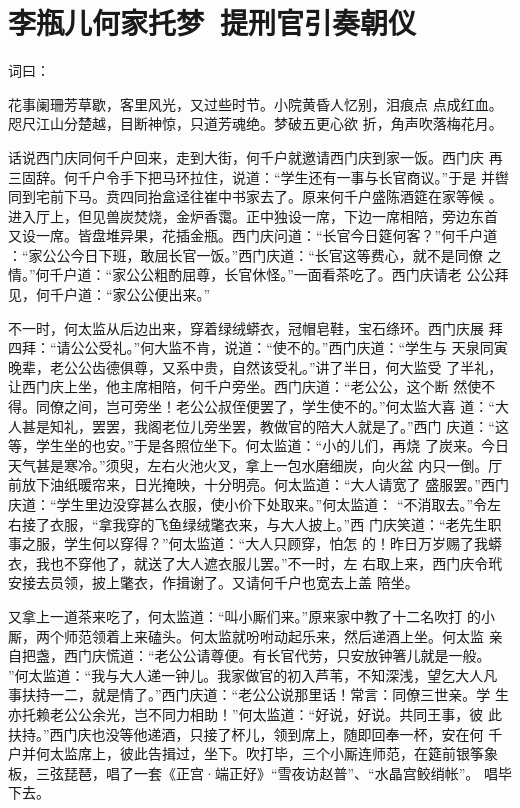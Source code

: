 \chapter{李瓶儿何家托梦~提刑官引奏朝仪}

词曰：

花事阑珊芳草歇，客里风光，又过些时节。小院黄昏人忆别，泪痕点
点成红血。  咫尺江山分楚越，目断神惊，只道芳魂绝。梦破五更心欲
折，角声吹落梅花月。

话说西门庆同何千户回来，走到大街，何千户就邀请西门庆到家一饭。西门庆
再三固辞。何千户令手下把马环拉住，说道：“学生还有一事与长官商议。”于是
并辔同到宅前下马。贲四同抬盒迳往崔中书家去了。原来何千户盛陈酒筵在家等候
。进入厅上，但见兽炭焚烧，金炉香霭。正中独设一席，下边一席相陪，旁边东首
又设一席。皆盘堆异果，花插金瓶。西门庆问道：“长官今日筵何客？”何千户道
：“家公公今日下班，敢屈长官一饭。”西门庆道：“长官这等费心，就不是同僚
之情。”何千户道：“家公公粗酌屈尊，长官休怪。”一面看茶吃了。西门庆请老
公公拜见，何千户道：“家公公便出来。”

不一时，何太监从后边出来，穿着绿绒蟒衣，冠帽皂鞋，宝石绦环。西门庆展
拜四拜：“请公公受礼。”何大监不肯，说道：“使不的。”西门庆道：“学生与
天泉同寅晚辈，老公公齿德俱尊，又系中贵，自然该受礼。”讲了半日，何大监受
了半礼，让西门庆上坐，他主席相陪，何千户旁坐。西门庆道：“老公公，这个断
然使不得。同僚之间，岂可旁坐！老公公叔侄便罢了，学生使不的。”何太监大喜
道：“大人甚是知礼，罢罢，我阁老位儿旁坐罢，教做官的陪大人就是了。”西门
庆道：“这等，学生坐的也安。”于是各照位坐下。何太监道：“小的儿们，再烧
了炭来。今日天气甚是寒冷。”须臾，左右火池火叉，拿上一包水磨细炭，向火盆
内只一倒。厅前放下油纸暖帘来，日光掩映，十分明亮。何太监道：“大人请宽了
盛服罢。”西门庆道：“学生里边没穿甚么衣服，使小价下处取来。”何太监道：
“不消取去。”令左右接了衣服，“拿我穿的飞鱼绿绒氅衣来，与大人披上。”西
门庆笑道：“老先生职事之服，学生何以穿得？”何太监道：“大人只顾穿，怕怎
的！昨日万岁赐了我蟒衣，我也不穿他了，就送了大人遮衣服儿罢。”不一时，左
右取上来，西门庆令玳安接去员领，披上氅衣，作揖谢了。又请何千户也宽去上盖
陪坐。

又拿上一道茶来吃了，何太监道：“叫小厮们来。”原来家中教了十二名吹打
的小厮，两个师范领着上来磕头。何太监就吩咐动起乐来，然后递酒上坐。何太监
亲自把盏，西门庆慌道：“老公公请尊便。有长官代劳，只安放钟箸儿就是一般。
”何太监道：“我与大人递一钟儿。我家做官的初入芦苇，不知深浅，望乞大人凡
事扶持一二，就是情了。”西门庆道：“老公公说那里话！常言：同僚三世亲。学
生亦托赖老公公余光，岂不同力相助！”何太监道：“好说，好说。共同王事，彼
此扶持。”西门庆也没等他递酒，只接了杯儿，领到席上，随即回奉一杯，安在何
千户并何太监席上，彼此告揖过，坐下。吹打毕，三个小厮连师范，在筵前银筝象
板，三弦琵琶，唱了一套《正宫·端正好》“雪夜访赵普”、“水晶宫鲛绡帐”。
唱毕下去。

